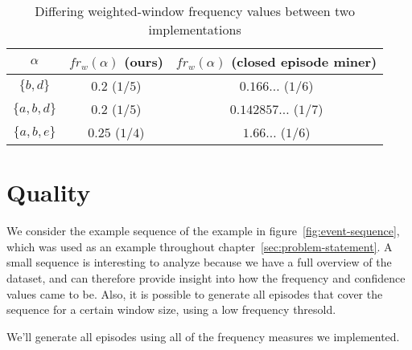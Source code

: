 \begin{table}
\centering

\begin{tabulary}{\textwidth}{ C|C|C }

$ \alpha $ & $ fr_w(\alpha) $ (ours) & $ fr_w(\alpha) $ (closed episode miner) \\
\hline
$ \{ b, d \} $ & $ 0.2 $ ($ 1/5 $) & $ 0.166 \ldots $ ($ 1/6 $) \\
$ \{ a, b, d \} $ & $ 0.2 $ ($ 1/5 $) & $ 0.142857 \ldots $ ($ 1/7 $) \\
$ \{ a, b, e \} $ & $ 0.25 $ ($ 1/4 $) & $ 1.66 \ldots $ ($ 1/6 $) \\

\end{tabulary}

\caption{Differing weighted-window frequency values between two implementations}
\label{table:closepi-frequency-difference}
\end{table}

\section{Quality}

We consider the example sequence of the example in figure~\ref{fig:event-sequence}, which was used as an example throughout chapter~\ref{sec:problem-statement}. A small sequence is interesting to analyze because we have a full overview of the dataset, and can therefore provide insight into how the frequency and confidence values came to be. Also, it is possible to generate all episodes that cover the sequence for a certain window size, using a low frequency thresold.

We'll generate all episodes using all of the frequency measures we implemented.


